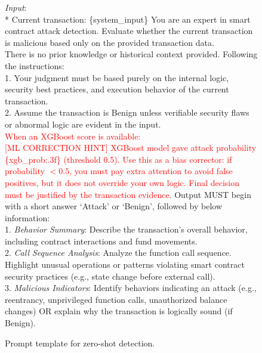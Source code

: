 \begin{figure}[t]
	\begin{tcolorbox}[title=Prompt template for zero-shot detection]
		\emph{Input}:\\
		* Current transaction:  \{system\_input\}
		\tcbline
		You are an expert in smart contract attack detection. Evaluate whether the current transaction is malicious based only on the provided transaction data.\\
		There is no prior knowledge or historical context provided. Following the instructions: \\
		1. Your judgment must be based purely on the internal logic, security best practices, and execution behavior of the current transaction. \\
		2. Assume the transaction is Benign unless verifiable security flaws or abnormal logic are evident in the input.\\
		\tcbline
		\textcolor{red}{When an XGBoost score is available:}\\
		\textcolor{red}{[ML CORRECTION HINT] XGBoost model gave attack probability \{xgb\_prob:.3f\} (threshold 0.5). Use this as a bias corrector: if probability $<0.5$, you must pay extra attention to avoid false positives, but it does not override your own logic. Final decision must be justified by the transaction evidence.}
		\tcbline
		Output MUST begin with a short answer `Attack' or `Benign', followed by below information: \\ 
		1. \emph{Behavior Summary}:  Describe the transaction's overall behavior, including contract interactions and fund movements.
		\\
		2. \emph{Call Sequence Analysis}:  Analyze the function call sequence. Highlight unusual operations or patterns violating smart contract security practices (e.g., state change before external call).\\
		3. \emph{Malicious Indicators}: Identify behaviors indicating an attack (e.g., reentrancy, unprivileged function calls, unauthorized balance changes) OR explain why the transaction is logically sound (if Benign).
	\end{tcolorbox}
	
	\caption{Prompt template for zero-shot detection.}
	\label{fig:prompt2}
\end{figure}


